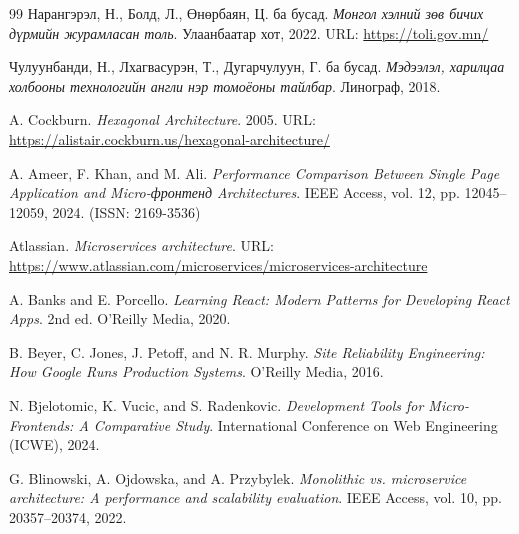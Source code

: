 

\singlespace
{}
\begin{thebibliography}{99}
    Нарангэрэл, Н., Болд, Л., Өнөрбаян, Ц. ба бусад.
    \textit{Монгол хэлний зөв бичих дүрмийн журамласан толь}.
    Улаанбаатар хот, 2022.
    URL: \url{https://toli.gov.mn/}

    Чулуунбанди, Н., Лхагвасурэн, Т., Дугарчулуун, Г. ба бусад.
    \textit{Мэдээлэл, харилцаа холбооны технологийн англи нэр томоёоны тайлбар}.
    Линограф, 2018.

    A. Cockburn.
    \textit{Hexagonal Architecture}.
    2005.
    URL: \url{https://alistair.cockburn.us/hexagonal-architecture/}

    A. Ameer, F. Khan, and M. Ali.
    \textit{Performance Comparison Between Single Page Application and Micro-фронтенд Architectures}.
    IEEE Access, vol. 12, pp. 12045–12059, 2024. (ISSN: 2169-3536)

    Atlassian.
    \textit{Microservices architecture}.
    URL: \url{https://www.atlassian.com/microservices/microservices-architecture}

    A. Banks and E. Porcello.
    \textit{Learning React: Modern Patterns for Developing React Apps}.
    2nd ed. O'Reilly Media, 2020.

    B. Beyer, C. Jones, J. Petoff, and N. R. Murphy.
    \textit{Site Reliability Engineering: How Google Runs Production Systems}.
    O'Reilly Media, 2016.

    N. Bjelotomic, K. Vucic, and S. Radenkovic.
    \textit{Development Tools for Micro-Frontends: A Comparative Study}.
    International Conference on Web Engineering (ICWE), 2024.

    G. Blinowski, A. Ojdowska, and A. Przybylek.
    \textit{Monolithic vs. microservice architecture: A performance and scalability evaluation}.
    IEEE Access, vol. 10, pp. 20357–20374, 2022.


\end{thebibliography}
